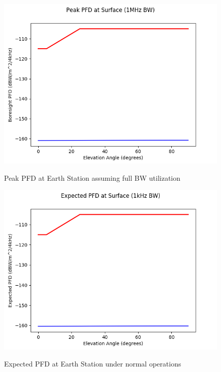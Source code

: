 \documentclass{article}
\begin{document}
\begin{center}
  
  \begin{figure}
    \caption{Peak PFD at Earth Station assuming full BW utilization}
    \includegraphics[width=\linewidth]{./pfd-canonical-4kHz.png}
    \label{fig::pfd::pfd-canonical-4kHz}
  \end{figure}
        

  \begin{figure}
    \caption{Expected PFD at Earth Station under normal operations}
    \includegraphics[width=\linewidth]{./pfd-expected-4kHz.png}
    \label{fig::pfd::pfd-expected-4kHz}
  \end{figure}
        


\end{center}
\end{document}
